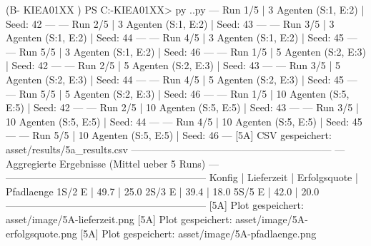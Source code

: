 (B- KIEA01XX ) PS C:\Users\USERNAME\Downloads\B-KIEA01XX> py .\experiment.py
--- Run 1/5 | 3 Agenten (S:1, E:2) | Seed: 42 ---
--- Run 2/5 | 3 Agenten (S:1, E:2) | Seed: 43 ---
--- Run 3/5 | 3 Agenten (S:1, E:2) | Seed: 44 ---
--- Run 4/5 | 3 Agenten (S:1, E:2) | Seed: 45 ---
--- Run 5/5 | 3 Agenten (S:1, E:2) | Seed: 46 ---
--- Run 1/5 | 5 Agenten (S:2, E:3) | Seed: 42 ---
--- Run 2/5 | 5 Agenten (S:2, E:3) | Seed: 43 ---
--- Run 3/5 | 5 Agenten (S:2, E:3) | Seed: 44 ---
--- Run 4/5 | 5 Agenten (S:2, E:3) | Seed: 45 ---
--- Run 5/5 | 5 Agenten (S:2, E:3) | Seed: 46 ---
--- Run 1/5 | 10 Agenten (S:5, E:5) | Seed: 42 ---
--- Run 2/5 | 10 Agenten (S:5, E:5) | Seed: 43 ---
--- Run 3/5 | 10 Agenten (S:5, E:5) | Seed: 44 ---
--- Run 4/5 | 10 Agenten (S:5, E:5) | Seed: 45 ---
--- Run 5/5 | 10 Agenten (S:5, E:5) | Seed: 46 ---
[5A]      CSV gespeichert: asset/results/5a_results.csv
------------------------------------------------------------
--- Aggregierte Ergebnisse (Mittel ueber 5 Runs) ---
------------------------------------------------------------
Konfig   | Lieferzeit | Erfolgsquote | Pfadlaenge
   1S/2  E |       49.7 |        25.0%
   2S/3  E |       39.4 |        18.0%
   5S/5  E |       42.0 |        20.0%
------------------------------------------------------------
[5A]      Plot gespeichert: asset/image/5A-lieferzeit.png
[5A]      Plot gespeichert: asset/image/5A-erfolgsquote.png
[5A]      Plot gespeichert: asset/image/5A-pfadlaenge.png